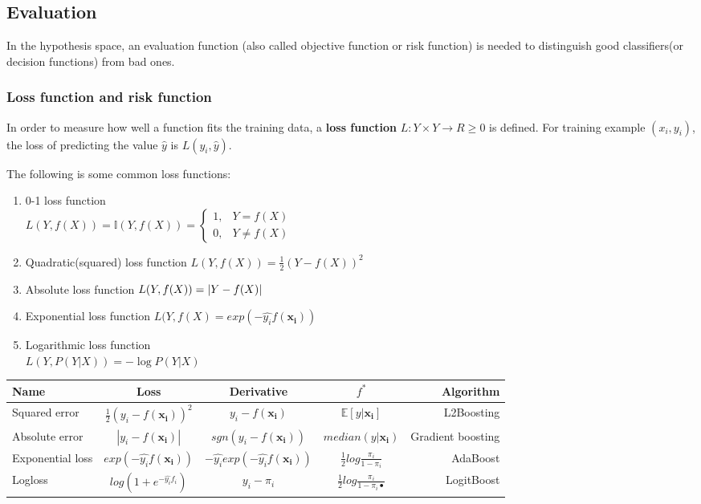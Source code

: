 \subsection{Evaluation}
In the hypothesis space, an evaluation function (also called objective function or risk function) is needed to distinguish good classifiers(or decision functions) from bad ones.


\subsubsection{Loss function and risk function}
\label{sec:Loss-function-and-risk-function}

\begin{definition}
In order to measure how well a function fits the training data, a \textbf{loss function} $L:Y \times Y \rightarrow R \geq 0$ is defined. For training example $(x_i,y_i)$, the loss of predicting the value $\widehat{y}$ is $L(y_i,\widehat{y})$.
\end{definition}

The following is some common loss functions:
\begin{enumerate}
\item 0-1 loss function \\ $L(Y,f(X))=\mathbb{I}(Y,f(X))=\begin{cases} 1, & Y=f(X) \\ 0, & Y \neq f(X) \end{cases}$
\item Quadratic(squared) loss function $L(Y,f(X))=\frac{1}{2}\left(Y-f(X)\right)^2$
\item Absolute loss function $L(Y,f(X))=\left\lvert Y-f(X)\right\rvert$
\item Exponential loss function $L(Y,f(X)=exp(-\hat{y_i}f(\mathbf{x_i}))$ 
\item Logarithmic loss function \\ $L(Y,P(Y|X))=-\log{P(Y|X)}$
\end{enumerate}

\begin{tabular}{l*{3}{c}r}
Name & Loss & Derivative & $f^*$ & Algorithm                                                                                 \\
\hline
Squared error & $\frac{1}{2}(y_i-f(\mathbf{x_i}))^2$ & $y_i - f(\mathbf{x_i})$ & $\mathbb{E}[y|\mathbf{x_i}]$ & L2Boosting \\
Absolute error & $|y_i-f(\mathbf{x_i})|$ & $sgn(y_i-f(\mathbf{x_i}))$ & $median(y|\mathbf{x_i})$ & Gradient boosting \\
Exponential loss & $exp(-\hat{y_i}f(\mathbf{x_i}))$ & $-\hat{y_i}exp(-\hat{y_i}f(\mathbf{x_i}))$ & $\frac{1}{2}log\frac{\pi_i}{1-\pi_i}$ & AdaBoost \\
Logloss & $log(1+e^{-\hat{y_i}f_i})$ & $y_i-\pi_i$ & $\frac{1}{2}log\frac{\pi_i}{1-\pi_i•}$ & LogitBoost \\
\hline
\end{tabular}

